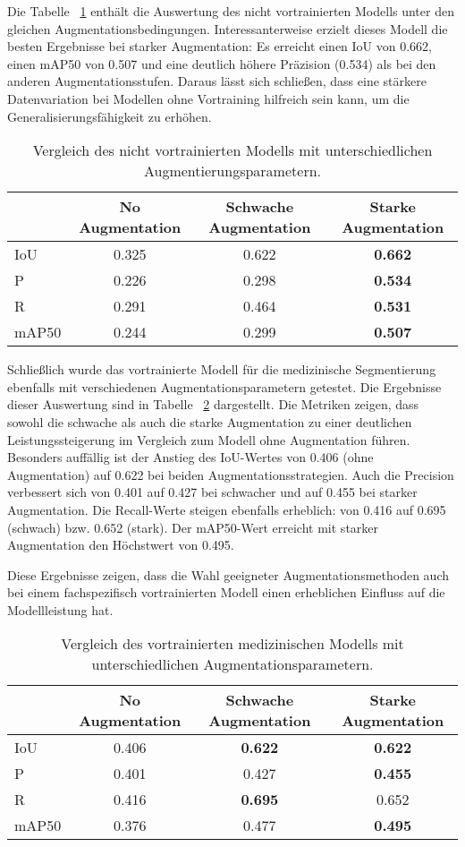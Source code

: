 \documentclass[
	german,
	accentcolor=10c,%
	type=intern,
	marginpar=false
	]{tudapub}
\begin{document}
Die Tabelle ~\ref{tab:yolov11-no-pretrain} enthält die Auswertung des nicht vortrainierten Modells unter den gleichen Augmentationsbedingungen. Interessanterweise erzielt dieses Modell die besten Ergebnisse bei starker Augmentation: Es erreicht einen IoU von 0.662, einen mAP50 von 0.507 und eine deutlich höhere Präzision (0.534) als bei den anderen Augmentationsstufen. Daraus lässt sich schließen, dass eine stärkere Datenvariation bei Modellen ohne Vortraining hilfreich sein kann, um die Generalisierungsfähigkeit zu erhöhen.

\begin{table}[H]
\centering
\begin{tabular}{l|c|c|c}
\textbf{} & \textbf{No Augmentation} & \textbf{Schwache Augmentation} & \textbf{Starke Augmentation} \\
\hline
IoU     & 0.325 & 0.622 & \textbf{0.662} \\
P       & 0.226 & 0.298 & \textbf{0.534} \\
R       & 0.291 & 0.464 & \textbf{0.531} \\
mAP50   & 0.244 & 0.299 & \textbf{0.507} \\
\end{tabular}
\caption{Vergleich des nicht vortrainierten Modells mit unterschiedlichen Augmentierungsparametern.}
\label{tab:yolov11-no-pretrain}
\end{table}

Schließlich wurde das vortrainierte Modell für die medizinische Segmentierung ebenfalls mit verschiedenen Augmentationsparametern getestet. Die Ergebnisse dieser Auswertung sind in Tabelle ~\ref{tab:pretrained-med-aug} dargestellt. Die Metriken zeigen, dass sowohl die schwache als auch die starke Augmentation zu einer deutlichen Leistungssteigerung im Vergleich zum Modell ohne Augmentation führen. Besonders auffällig ist der Anstieg des IoU-Wertes von 0.406 (ohne Augmentation) auf 0.622 bei beiden Augmentationsstrategien. Auch die Precision verbessert sich von 0.401 auf 0.427 bei schwacher und auf 0.455 bei starker Augmentation. Die Recall-Werte steigen ebenfalls erheblich: von 0.416 auf 0.695 (schwach) bzw. 0.652 (stark). Der mAP50-Wert erreicht mit starker Augmentation den Höchstwert von 0.495.

Diese Ergebnisse zeigen, dass die Wahl geeigneter Augmentationsmethoden auch bei einem fachspezifisch vortrainierten Modell einen erheblichen Einfluss auf die Modellleistung hat.
\begin{table}[H]
\centering
\begin{tabular}{l|c|c|c}
& \textbf{No Augmentation} & \textbf{Schwache Augmentation} & \textbf{Starke Augmentation} \\
\hline
IoU & 0.406 & \textbf{0.622} & \textbf{0.622} \\
P & 0.401 & 0.427 & \textbf{0.455} \\
R & 0.416 & \textbf{0.695} & 0.652 \\
mAP50 & 0.376 & 0.477 & \textbf{0.495} \\
\end{tabular}
\caption{Vergleich des vortrainierten medizinischen Modells mit unterschiedlichen Augmentationsparametern.}
\label{tab:pretrained-med-aug}
\end{table}
\end{document}
